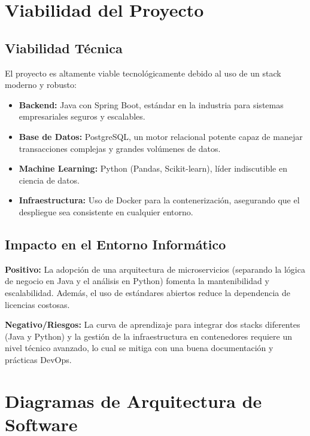 \documentclass[12pt, a4paper]{article}
\begin{document}
	\section{Viabilidad del Proyecto}
	
	\subsection{Viabilidad Técnica}
	El proyecto es altamente viable tecnológicamente debido al uso de un stack moderno y robusto:
	\begin{itemize}
		\item \textbf{Backend:} Java con Spring Boot, estándar en la industria para sistemas empresariales seguros y escalables.
		\item \textbf{Base de Datos:} PostgreSQL, un motor relacional potente capaz de manejar transacciones complejas y grandes volúmenes de datos.
		\item \textbf{Machine Learning:} Python (Pandas, Scikit-learn), líder indiscutible en ciencia de datos.
		\item \textbf{Infraestructura:} Uso de Docker para la contenerización, asegurando que el despliegue sea consistente en cualquier entorno.
	\end{itemize}
	
	\subsection{Impacto en el Entorno Informático}
	\textbf{Positivo:} La adopción de una arquitectura de microservicios (separando la lógica de negocio en Java y el análisis en Python) fomenta la mantenibilidad y escalabilidad. Además, el uso de estándares abiertos reduce la dependencia de licencias costosas.
	
	\textbf{Negativo/Riesgos:} La curva de aprendizaje para integrar dos stacks diferentes (Java y Python) y la gestión de la infraestructura en contenedores requiere un nivel técnico avanzado, lo cual se mitiga con una buena documentación y prácticas DevOps.
	
	\section{Diagramas de Arquitectura de Software}
	
\end{document}
